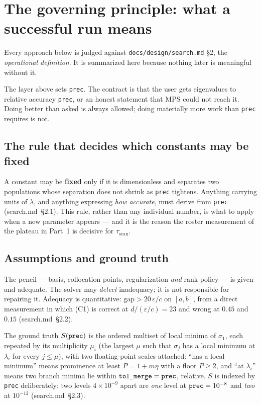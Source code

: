 \documentclass[11pt]{article}
\newcommand{\file}[1]{\texttt{#1}}
\newcommand{\sm}[1]{(search.md~\S#1)}
\newcommand{\sig}{\sigma}
\newcommand{\sione}{\sig_1}
\newcommand{\lam}{\lambda}
\begin{document}
\section{The governing principle: what a successful run means}
\label{sec:opdef}

Every approach below is judged against \file{docs/design/search.md} \S2, the \emph{operational
definition}. It is summarized here because nothing later is meaningful without it.

The layer above sets \verb|prec|. The contract is that the user gets eigenvalues to relative
accuracy \verb|prec|, or an honest statement that MPS could not reach it. Doing better than
asked is always allowed; doing materially more work than \verb|prec| requires is not.

\subsection{The rule that decides which constants may be fixed}

A constant may be \textbf{fixed} only if it is dimensionless and separates two populations
whose separation does not shrink as \verb|prec| tightens. Anything carrying units of $\lam$,
and anything expressing \emph{how accurate}, must derive from \verb|prec| \sm{2.1}. This rule,
rather than any individual number, is what to apply when a new parameter appears --- and it is
the reason the roster measurement of the plateau in Part~1 is decisive for
$\tau_{\mathrm{scan}}$.

\subsection{Assumptions and ground truth}

The pencil --- basis, collocation points, regularization \emph{and} rank policy --- is given
and adequate. The solver may \emph{detect} inadequacy; it is not responsible for repairing it.
Adequacy is quantitative: $\text{gap} > 20\,\varepsilon/c$ on $[a,b]$, from a direct
measurement in which (C1) is correct at $d/(\varepsilon/c) = 23$ and wrong at $0.45$ and
$0.15$ \sm{2.2}.

The ground truth $S(\verb|prec|)$ is the ordered multiset of local minima of $\sione$, each
repeated by its multiplicity $\mu_i$ (the largest $\mu$ such that $\sig_j$ has a local minimum
at $\lam_i$ for every $j \le \mu$), with two floating-point scales attached: ``has a local
minimum'' means prominence at least $P = 1 + m\eta$ with a floor $P \ge 2$, and ``at $\lam_i$''
means two branch minima lie within $\verb|tol_merge| = \verb|prec|$, relative. $S$ is indexed
by \verb|prec| deliberately: two levels $4\times10^{-9}$ apart are \emph{one} level at
$\verb|prec| = 10^{-8}$ and \emph{two} at $10^{-12}$ \sm{2.3}.
\end{document}
